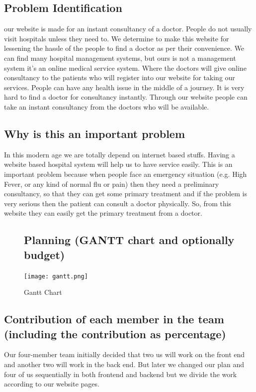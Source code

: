 \documentclass[14pt,a4paper,calibribody]{article}
\begin{document}
\subsection{Problem Identification} 

our website is made for an instant consultancy of a doctor. People do not usually visit hospitals unless they need to. We determine to make this website for lessening the hassle of the people to find a doctor as per their convenience. We can find many hospital management systems, but ours is not a management system it’s an online medical service system. Where the doctors will give online consultancy to the patients who will register into our website for taking our services. People can have any health issue in the middle of a journey. It is very hard to find a doctor for consultancy instantly. Through our website people can take an instant consultancy from the doctors who will be available.\\
\clearpage
\subsection{Why is this an important problem}

In this modern age we are totally depend on internet based stuffs. Having a website based hospital system will help us to have service easily. This is an important problem because when people face an emergency situation (e.g. High Fever, or any kind of normal flu or pain) then they need a preliminary consultancy, so that they can get some primary treatment and if the problem is very serious then the patient can consult a doctor physically. So, from this website they can easily get the primary treatment from a doctor. \\
\begin{figure}[h]
\subsection{Planning (GANTT chart and optionally budget)}
\texttt{[image: gantt.png]}
\caption{Gantt Chart}
\end{figure}
\subsection{Contribution of each member in the team (including the contribution as percentage)}
Our four-member team initially decided that two us will work on the front end and another two will work in the back end. But later we changed our plan and four of us sequentially in both frontend and backend but we divide the work according to our website pages.\\
\end{document}
